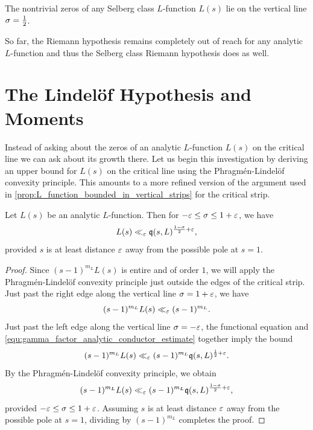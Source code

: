     \begin{conjecture*}
      The nontrivial zeros of any Selberg class \(L\)-function \(L(s)\) lie on the vertical line \(\sigma = \frac{1}{2}\).
    \end{conjecture*}

    So far, the Riemann hypothesis remains completely out of reach for any analytic \(L\)-function and thus the Selberg class Riemann hypothesis does as well.
  \section{The Lindel\"of Hypothesis and Moments}
    Instead of asking about the zeros of an analytic \(L\)-function \(L(s)\) on the critical line we can ask about its growth there. Let us begin this investigation by deriving an upper bound for \(L(s)\) on the critical line using the Phragm\'en-Lindel\"of convexity principle. This amounts to a more refined version of the argument used in \cref{prop:L_function_bounded_in_vertical_strips} for the critical strip.

    \begin{theorem}\label{thm:convexity_bound_for_L_function_in_critial_strip}
      Let \(L(s)\) be an analytic \(L\)-function. Then for \(-\varepsilon \le \sigma \le 1+\varepsilon\), we have
      \[
        L(s) \ll_{\varepsilon} \mathfrak{q}(s,L)^{\frac{1-\sigma}{2}+\varepsilon},
      \]
      provided \(s\) is at least distance \(\varepsilon\) away from the possible pole at \(s = 1\).
    \end{theorem}
    \begin{proof}
      Since \((s-1)^{m_{L}}L(s)\) is entire and of order \(1\), we will apply the Phragm\'en-Lindel\"of convexity principle just outside the edges of the critical strip. Just past the right edge along the vertical line \(\sigma = 1+\varepsilon\), we have
      \[
        (s-1)^{m_{L}}L(s) \ll_{\varepsilon} (s-1)^{m_{L}}.
      \]
      Just past the left edge along the vertical line \(\sigma = -\varepsilon\), the functional equation and \cref{equ:gamma_factor_analytic_conductor_estimate} together imply the bound
      \[
        (s-1)^{m_{L}}L(s) \ll_{\varepsilon} (s-1)^{m_{L}}\mathfrak{q}(s,L)^{\frac{1}{2}+\varepsilon}.
      \]
      By the Phragm\'en-Lindel\"of convexity principle, we obtain
      \[
        (s-1)^{m_{L}}L(s) \ll_{\varepsilon} (s-1)^{m_{L}}\mathfrak{q}(s,L)^{\frac{1-\sigma}{2}+\varepsilon},
      \]
      provided \(-\varepsilon \le \sigma \le 1+\varepsilon\). Assuming \(s\) is at least distance \(\varepsilon\) away from the possible pole at \(s = 1\), dividing by \((s-1)^{m_{L}}\) completes the proof.
    \end{proof}
    
